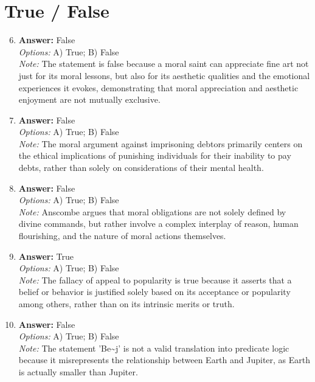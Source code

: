 \documentclass[12pt]{article}
\begin{document}
\section*{True / False}
\begin{enumerate}[label=\arabic*.]
\setcounter{enumi}{5}
\item \textbf{Answer:} False
\\ \textit{Options:} A) True; B) False
\\ \textit{Note:} The statement is false because a moral saint can appreciate fine art not just for its moral lessons, but also for its aesthetic qualities and the emotional experiences it evokes, demonstrating that moral appreciation and aesthetic enjoyment are not mutually exclusive.
\item \textbf{Answer:} False
\\ \textit{Options:} A) True; B) False
\\ \textit{Note:} The moral argument against imprisoning debtors primarily centers on the ethical implications of punishing individuals for their inability to pay debts, rather than solely on considerations of their mental health.
\item \textbf{Answer:} False
\\ \textit{Options:} A) True; B) False
\\ \textit{Note:} Anscombe argues that moral obligations are not solely defined by divine commands, but rather involve a complex interplay of reason, human flourishing, and the nature of moral actions themselves.
\item \textbf{Answer:} True
\\ \textit{Options:} A) True; B) False
\\ \textit{Note:} The fallacy of appeal to popularity is true because it asserts that a belief or behavior is justified solely based on its acceptance or popularity among others, rather than on its intrinsic merits or truth.
\item \textbf{Answer:} False
\\ \textit{Options:} A) True; B) False
\\ \textit{Note:} The statement 'Be\textasciitilde{}j' is not a valid translation into predicate logic because it misrepresents the relationship between Earth and Jupiter, as Earth is actually smaller than Jupiter.
\end{enumerate}
\end{document}
